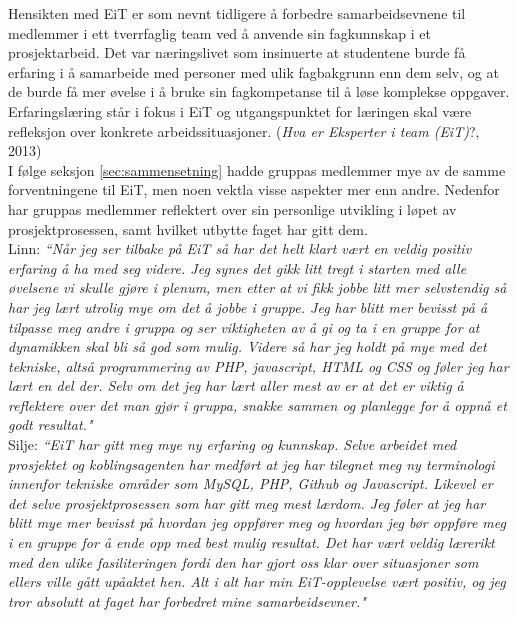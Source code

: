 Hensikten med EiT er som nevnt tidligere å forbedre samarbeidsevnene til medlemmer i ett tverrfaglig team ved å anvende sin fagkunnskap i et prosjektarbeid. Det var næringslivet som insinuerte at studentene burde få erfaring i å samarbeide med personer med ulik fagbakgrunn enn dem selv, og at de burde få mer øvelse i å bruke sin fagkompetanse til å løse komplekse oppgaver. Erfaringslæring står i fokus i EiT og utgangspunktet for læringen skal være refleksjon over konkrete arbeidssituasjoner. (\textit{Hva er Eksperter i team (EiT)}?, 2013)\\

I følge seksjon \ref{sec:sammensetning} hadde gruppas medlemmer mye av de samme forventningene til EiT, men noen vektla visse aspekter mer enn andre. Nedenfor har gruppas medlemmer reflektert over sin personlige utvikling i løpet av prosjektprosessen, samt hvilket utbytte faget har gitt dem.\\

Linn: \textit{``Når jeg ser tilbake på EiT så har det helt klart vært en veldig positiv erfaring å ha med seg videre. Jeg synes det gikk litt tregt i starten med alle øvelsene vi skulle gjøre i plenum, men etter at vi fikk jobbe litt mer selvstendig så har jeg lært utrolig mye om det å jobbe i gruppe. Jeg har blitt mer bevisst på å tilpasse meg andre i gruppa og ser viktigheten av å gi og ta i en gruppe for at dynamikken skal bli så god som mulig. Videre så har jeg holdt på mye med det tekniske, altså programmering av PHP, javascript, HTML og CSS og føler jeg har lært en del der. Selv om det jeg har lært aller mest av er at det er viktig å reflektere over det man gjør i gruppa, snakke sammen og planlegge for å oppnå et godt resultat."}\\

Silje: \textit{``EiT har gitt meg mye ny erfaring og kunnskap. Selve arbeidet med prosjektet og koblingsagenten har medført at jeg har tilegnet meg ny terminologi innenfor tekniske områder som MySQL, PHP, Github og Javascript. Likevel er det selve prosjektprosessen som har gitt meg mest lærdom. Jeg føler at jeg har blitt mye mer bevisst på hvordan jeg oppfører meg og hvordan jeg bør oppføre meg i en gruppe for å ende opp med best mulig resultat. Det har vært veldig lærerikt med den ulike fasiliteringen fordi den har gjort oss klar over situasjoner som ellers ville gått upåaktet hen. Alt i alt har min EiT-opplevelse vært positiv, og jeg tror absolutt at faget har forbedret mine samarbeidsevner."}\\

